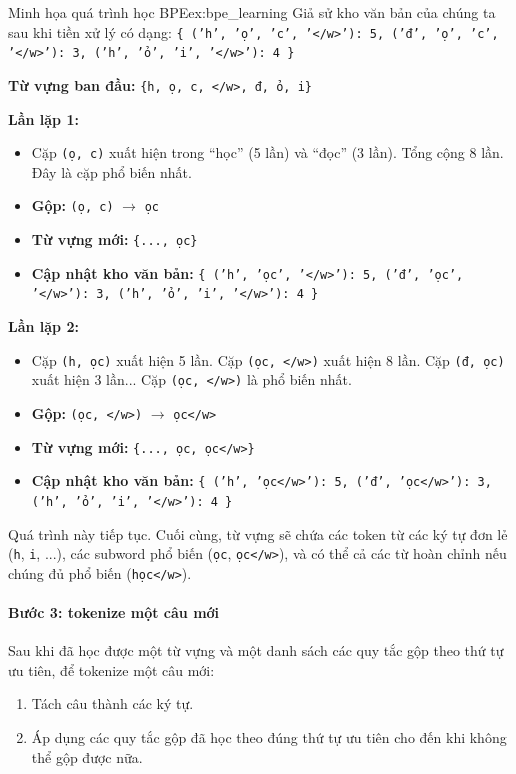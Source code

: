 \begin{example}{Minh họa quá trình học BPE}{ex:bpe_learning}
    Giả sử kho văn bản của chúng ta sau khi tiền xử lý có dạng:
    \texttt{\{ ('h', 'ọ', 'c', '</w>'): 5, ('đ', 'ọ', 'c', '</w>'): 3, ('h', 'ỏ', 'i', '</w>'): 4 \}}

    \textbf{Từ vựng ban đầu:} \texttt{\{h, ọ, c, </w>, đ, ỏ, i\}}
    
    \textbf{Lần lặp 1:}
    \begin{itemize}
        \item Cặp \texttt{(ọ, c)} xuất hiện trong “học” (5 lần) và “đọc” (3 lần). Tổng cộng 8 lần. Đây là cặp phổ biến nhất.
        \item \textbf{Gộp:} \texttt{(ọ, c)} $\rightarrow$ \texttt{ọc}
        \item \textbf{Từ vựng mới:} \texttt{\{..., ọc\}}
        \item \textbf{Cập nhật kho văn bản:} \texttt{\{ ('h', 'ọc', '</w>'): 5, ('đ', 'ọc', '</w>'): 3, ('h', 'ỏ', 'i', '</w>'): 4 \}}
    \end{itemize}

    \textbf{Lần lặp 2:}
    \begin{itemize}
        \item Cặp \texttt{(h, ọc)} xuất hiện 5 lần. Cặp \texttt{(ọc, </w>)} xuất hiện 8 lần. Cặp \texttt{(đ, ọc)} xuất hiện 3 lần... Cặp \texttt{(ọc, </w>)} là phổ biến nhất.
        \item \textbf{Gộp:} \texttt{(ọc, </w>)} $\rightarrow$ \texttt{ọc</w>}
        \item \textbf{Từ vựng mới:} \texttt{\{..., ọc, ọc</w>\}}
        \item \textbf{Cập nhật kho văn bản:} \texttt{\{ ('h', 'ọc</w>'): 5, ('đ', 'ọc</w>'): 3, ('h', 'ỏ', 'i', '</w>'): 4 \}}
    \end{itemize}
    
    Quá trình này tiếp tục. Cuối cùng, từ vựng sẽ chứa các token từ các ký tự đơn lẻ (\texttt{h}, \texttt{i}, ...), các subword phổ biến (\texttt{ọc}, \texttt{ọc</w>}), và có thể cả các từ hoàn chỉnh nếu chúng đủ phổ biến (\texttt{học</w>}).
\end{example}

\paragraph{Bước 3: tokenize một câu mới}
Sau khi đã học được một từ vựng và một danh sách các quy tắc gộp theo thứ tự ưu tiên, để tokenize một câu mới:
\begin{enumerate}
    \item Tách câu thành các ký tự.
    \item Áp dụng các quy tắc gộp đã học theo đúng thứ tự ưu tiên cho đến khi không thể gộp được nữa.
\end{enumerate}
